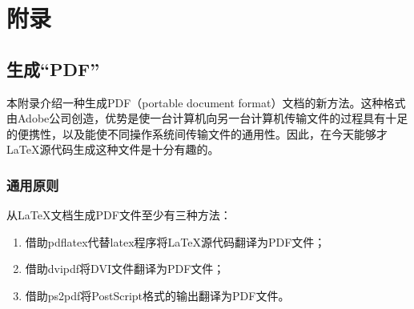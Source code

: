 \part{附录}
\appendix
\chapter{生成“PDF”}

本附录介绍一种生成PDF（portable document format）文档的新方法。这种格式由Adobe公司创造，优势是使一台计算机向另一台计算机传输文件的过程具有十足的便携性，以及能使不同操作系统间传输文件的通用性。因此，在今天能够才\LaTeX 源代码生成这种文件是十分有趣的。

\section{通用原则}

从\LaTeX 文档生成PDF文件至少有三种方法：

\begin{enumerate}
    \item 借助\textsf{pdflatex}代替\textsf{latex}程序将\LaTeX 源代码翻译为PDF文件；
    \item 借助\textsf{dvipdf}将DVI文件翻译为PDF文件；
    \item 借助\textsf{ps2pdf}将PostScript格式的输出翻译为PDF文件。
\end{enumerate}

